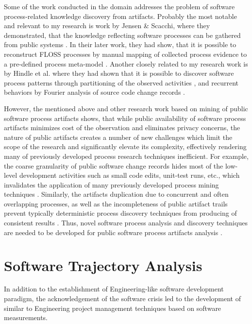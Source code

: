 Some of the work conducted in the domain addresses the problem of software process-related 
knowledge discovery from artifacts. Probably the most notable and relevant to 
my research is work by Jensen \& Scacchi, where they demonstrated, that the knowledge
reflecting software processes can be gathered from public systems \cite{citeulike:12550640}. 
In their later work, they had show, that it is possible to reconstruct FLOSS processes by manual mapping of 
collected process evidence to a pre-defined process meta-model \cite{citeulike:5043664} \cite{citeulike:5128808}. 
Another closely related to my research work is by Hindle et al. where they had shown that it is possible to 
discover software process patterns through partitioning of the observed activities \cite{citeulike:10377366},
and recurrent behaviors by Fourier analysis of source code change records \cite{citeulike:10377345}.

However, the mentioned above and other research work based on mining of public software process artifacts shows, 
that while public availability of software process artifacts minimizes cost of the observation and eliminates privacy concerns, 
the nature of public artifacts creates a number of new challenges which limit the scope of the research and 
significantly elevate its complexity, effectively rendering many of previously developed process research techniques 
inefficient. 
For example, the coarse granularity of public software change records hides most of the low-level development activities
such as small code edits, unit-test runs, etc., which invalidates the application of many previously developed process 
mining techniques \cite{citeulike:10377366} \cite{citeulike:2678511}.
Similarly, the artifacts duplication due to concurrent and often overlapping processes, as well as the incompleteness of 
public artifact trails prevent typically deterministic process discovery techniques from producing of consistent 
results \cite{citeulike:2678511}. Thus, novel software process analysis and discovery techniques are needed to be 
developed for public software process artifacts analysis \cite{citeulike:7853299}.

%
%
\section{Software Trajectory Analysis}\label{section_software_trajectory}
In addition to the establishment of Engineering-like software development paradigm, the acknowledgement of 
the software crisis led to the development of similar to Engineering project management techniques based on 
software measurements.

